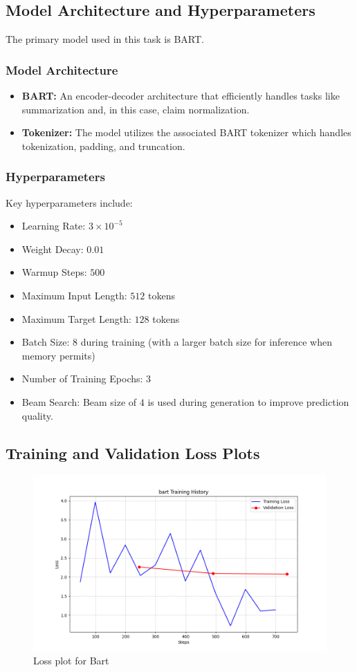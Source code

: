 \documentclass{article}
\begin{document}
\subsection{Model Architecture and Hyperparameters}
The primary model used in this task is BART.

\subsubsection*{Model Architecture}
\begin{itemize}
    \item \textbf{BART:} An encoder-decoder architecture that efficiently handles tasks like summarization and, in this case, claim normalization.
    \item \textbf{Tokenizer:} The model utilizes the associated BART tokenizer which handles tokenization, padding, and truncation.
\end{itemize}

\subsubsection*{Hyperparameters}
Key hyperparameters include:
\begin{itemize}
    \item Learning Rate: $3\times10^{-5}$
    \item Weight Decay: $0.01$
    \item Warmup Steps: $500$
    \item Maximum Input Length: $512$ tokens
    \item Maximum Target Length: $128$ tokens
    \item Batch Size: $8$ during training (with a larger batch size for inference when memory permits)
    \item Number of Training Epochs: $3$
    \item Beam Search: Beam size of $4$ is used during generation to improve prediction quality.
\end{itemize}

\subsection{Training and Validation Loss Plots}
\begin{figure}[H]
    \centering
    \includegraphics[width=1\textwidth]{bart_loss (1).png}
    \caption{Loss plot for Bart}
    \label{fig:Fig1}
\end{figure}
\end{document}
